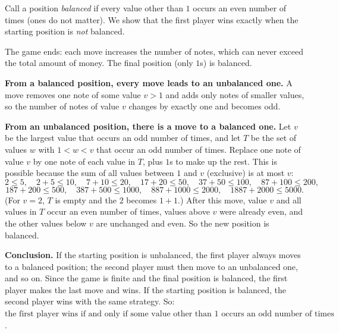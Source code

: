 Call a position \emph{balanced} if every value other than $1$ occurs an even number of times (ones do not matter). We show that the first player wins exactly when the starting position is \emph{not} balanced.

The game ends: each move increases the number of notes, which can never exceed the total amount of money. The final position (only $1$s) is balanced.

\textbf{From a balanced position, every move leads to an unbalanced one.} A move removes one note of some value $v>1$ and adds only notes of smaller values, so the number of notes of value $v$ changes by exactly one and becomes odd.

\textbf{From an unbalanced position, there is a move to a balanced one.} Let $v$ be the largest value that occurs an odd number of times, and let $T$ be the set of values $w$ with $1<w<v$ that occur an odd number of times. Replace one note of value $v$ by one note of each value in $T$, plus $1$s to make up the rest. This is possible because the sum of all values between $1$ and $v$ (exclusive) is at most $v$:
\[
2\le5,\quad 2+5\le10,\quad 7+10\le20,\quad 17+20\le50,\quad 37+50\le100,\quad 87+100\le200,
\]
\[
187+200\le500,\quad 387+500\le1000,\quad 887+1000\le2000,\quad 1887+2000\le5000 .
\]
(For $v=2$, $T$ is empty and the $2$ becomes $1+1$.) After this move, value $v$ and all values in $T$ occur an even number of times, values above $v$ were already even, and the other values below $v$ are unchanged and even. So the new position is balanced.

\textbf{Conclusion.} If the starting position is unbalanced, the first player always moves to a balanced position; the second player must then move to an unbalanced one, and so on. Since the game is finite and the final position is balanced, the first player makes the last move and wins. If the starting position is balanced, the second player wins with the same strategy. So: $\boxed{\text{the first player wins if and only if some value other than }1\text{ occurs an odd number of times}}$.
